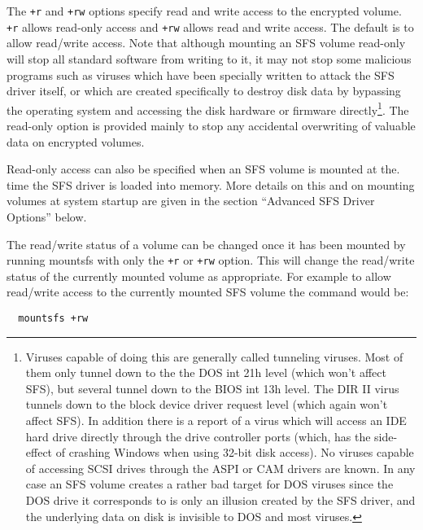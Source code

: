 The {\tt +r} and {\tt +rw} options specify read and write access to the encrypted
volume.  {\tt +r} allows read-only access and {\tt +rw} allows read and write access.
The default is to allow read/write access.  Note that although mounting an SFS
volume read-only will stop all standard software from writing to it, it may not
stop some malicious programs such as viruses which have been specially written
to attack the SFS driver itself, or which are created specifically to destroy
disk data by bypassing the operating system and accessing the disk hardware
or firmware directly\footnote{
               Viruses capable of doing this are generally called tunneling
               viruses.  Most of them only tunnel down to the the DOS int 21h
               level (which won't affect SFS), but several tunnel down to the
               BIOS int 13h level.  The DIR II virus tunnels down to the block
               device driver request level (which again won't affect SFS).  In
               addition there is a report of a virus which will access an IDE
               hard drive directly through the drive controller ports (which,
               has the side-effect of crashing Windows when using 32-bit disk
               access).  No viruses capable of accessing SCSI drives through the
               ASPI or CAM drivers are known.  In any case an SFS volume creates
               a rather bad target for DOS viruses since the DOS drive it
               corresponds to is only an illusion created by the SFS driver, and
               the underlying data on disk is invisible to DOS and most viruses.
}.  The read-only option is provided mainly to stop any
accidental overwriting of valuable data on encrypted volumes.

Read-only access can also be specified when an SFS volume is mounted at the.
time the SFS driver is loaded into memory.  More details on this and on 
mounting volumes at system startup are given in the section ``Advanced SFS 
Driver Options'' below.

The read/write status of a volume can be changed once it has been mounted by
running mountsfs with only the {\tt +r} or {\tt +rw} option.  This will change the
read/write status of the currently mounted volume as appropriate.  For example
to allow read/write access to the currently mounted SFS volume the command
would be:

{\tt \verb|  |mountsfs +rw}

